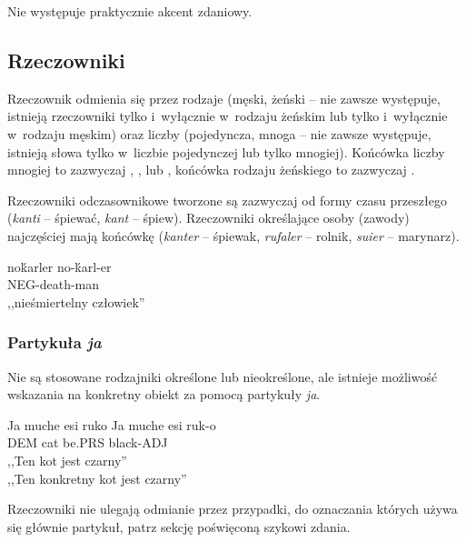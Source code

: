 \begin{spacing}{1.1}
Nie występuje praktycznie akcent zdaniowy.

\subsection{Rzeczowniki}
Rzeczownik odmienia się przez rodzaje (męski, żeński -- nie zawsze występuje,
istnieją rzeczowniki tylko i~wyłącznie w~rodzaju żeńskim lub tylko i~wyłącznie
w~rodzaju męskim) oraz liczby (pojedyncza, mnoga -- nie zawsze występuje,
istnieją słowa tylko w~liczbie pojedynczej lub tylko mnogiej). Końcówka liczby
mnogiej to zazwyczaj , ,  lub , końcówka rodzaju
żeńskiego to zazwyczaj .


Rzeczowniki odczasownikowe tworzone są zazwyczaj od formy czasu przeszłego
(\emph{kanti} -- śpiewać, \emph{kant} -- śpiew). Rzeczowniki określające osoby
(zawody) najczęściej mają końcówkę  (\emph{kanter} -- śpiewak,
\emph{rufaler} -- rolnik, \emph{suier} -- marynarz).

\begin{exe}
	\ex
	\trans noḱarler
	\gll  no-ḱarl-er \\
	  NEG-death-man \\
	\glt  ,,nieśmiertelny człowiek''
  \end{exe}

\subsubsection{Partykuła \emph{ja}}

Nie są stosowane rodzajniki określone lub nieokreślone, ale istnieje możliwość
wskazania na konkretny obiekt za pomocą partykuły \emph{ja}.

\begin{exe}
	\ex
	\trans Ja muche esi ruko
	\gll  Ja muche esi ruk-o \\
	  DEM cat be.PRS black-ADJ \\
	\glt  ,,Ten kot jest czarny'' \\ ,,Ten konkretny kot jest czarny''
  \end{exe}

Rzeczowniki nie ulegają odmianie przez przypadki, do oznaczania których używa
się głównie partykuł, patrz sekcję poświęconą szykowi zdania.


\end{spacing}
